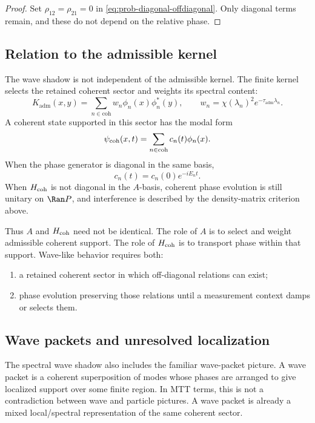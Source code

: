 \documentclass[11pt]{article}
\newcommand{\Kadm}{K_{\mathrm{adm}}}
\newcommand{\ta}{\tau_{\mathrm{adm}}}
\newcommand{\coh}{\mathrm{coh}}
\begin{document}
\begin{proof}
Set \(\rho_{12}=\rho_{21}=0\) in \eqref{eq:prob-diagonal-offdiagonal}. Only diagonal
terms remain, and these do not depend on the relative phase.
\end{proof}

\subsection{Relation to the admissible kernel}
\label{subsec:wave-relation-kernel}

The wave shadow is not independent of the admissible kernel. The finite kernel selects the
retained coherent sector and weights its spectral content:
\begin{equation}
  \Kadm(x,y)
  =
  \sum_{n\in\coh}
  w_n\phi_n(x)\phi_n^\ast(y),
  \qquad
  w_n=\chi(\lambda_n)^2e^{-\ta\lambda_n}.
  \label{eq:kernel-weights-wave}
\end{equation}
A coherent state supported in this sector has the modal form
\begin{equation}
  \psi_{\rm coh}(x,t)
  =
  \sum_{n\in\coh}
  c_n(t)\phi_n(x).
\end{equation}
When the phase generator is diagonal in the same basis,
\begin{equation}
  c_n(t)=c_n(0)e^{-iE_nt}.
\end{equation}
When \(H_{\rm coh}\) is not diagonal in the \(A\)-basis, coherent phase evolution is still
unitary on \(\Ran P\), and interference is described by the density-matrix criterion above.

Thus \(A\) and \(H_{\rm coh}\) need not be identical. The role of \(A\) is to select and weight
admissible coherent support. The role of \(H_{\rm coh}\) is to transport phase within that
support. Wave-like behavior requires both:
\begin{enumerate}[label=(\roman*)]
  \item a retained coherent sector in which off-diagonal relations can exist;
  \item phase evolution preserving those relations until a measurement context damps or
  selects them.
\end{enumerate}

\subsection{Wave packets and unresolved localization}
\label{subsec:wave-packets}

The spectral wave shadow also includes the familiar wave-packet picture. A wave packet is
a coherent superposition of modes whose phases are arranged to give localized support over
some finite region. In MTT terms, this is not a contradiction between wave and particle
pictures. A wave packet is already a mixed local/spectral representation of the same coherent
sector.
\end{document}
